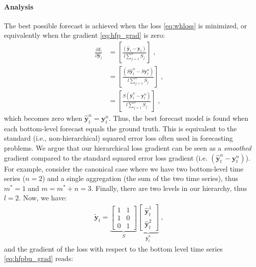 \documentclass[preprint, 3p, times, twocolumn]{elsarticle}
\begin{document}
\paragraph{Analysis} The best possible forecast is achieved when the loss \eqref{eq:whloss} is minimized, or equivalently when the gradient \eqref{eq:hfp_grad} is zero:
\begin{align} 
  \frac{\partial L}{\partial \hat{\textbf{y}}_{t}} &=  \left[ \frac{(\hat{\textbf{y}}_{t} - \textbf{y}_{t})}{l \sum_{j=1}^n S_{j}} \right] \;, \nonumber \\
                                                   &=  \left[ \frac{(S \hat{\textbf{y}}^n_{t} - S \textbf{y}^n_{t})}{l \sum_{j=1}^n S_{j}} \right] \;, \nonumber \\
                                                   &=  \left[ \frac{S(\hat{\textbf{y}}^n_{t} - \textbf{y}^n_{t})}{l \sum_{j=1}^n S_{j}} \right] \;, \nonumber
\end{align}
which becomes zero when \(\hat{\textbf{y}}^n_{t} = \textbf{y}^n_{t}\). Thus, the best forecast model is found when each bottom-level forecast equals the ground truth. This is equivalent to the standard (i.e., non-hierarchical) squared error loss often used in forecasting problems. We argue that our hierarchical loss gradient can be seen as a \textit{smoothed} gradient compared to the standard squared error loss gradient (i.e. \((\hat{\textbf{y}}^n_{t} - \textbf{y}^n_{t})\)). For example, consider the canonical case where we have two bottom-level time series (\(n=2\)) and a single aggregation (the sum of the two time series), thus \(m^* = 1\) and \(m = m^* + n = 3\). Finally, there are two levels in our hierarchy, thus \(l = 2\). Now, we have:
\begin{align}
  \tilde{\textbf{y}}_{t} = \underbrace{
    \begin{bmatrix}
    1 &1 \\
    1 &0 \\
    0 &1
    \end{bmatrix}}_S 
    \underbrace{    
    \begin{bmatrix}
      \hat{\textbf{y}}^1_{t} \\
      \hat{\textbf{y}}^2_{t}
    \end{bmatrix}}_{\hat{\textbf{y}}^n_{t}} \;,
\end{align}
and the gradient of the loss with respect to the bottom level time series \eqref{eq:hfpbu_grad} reads:
\end{document}
